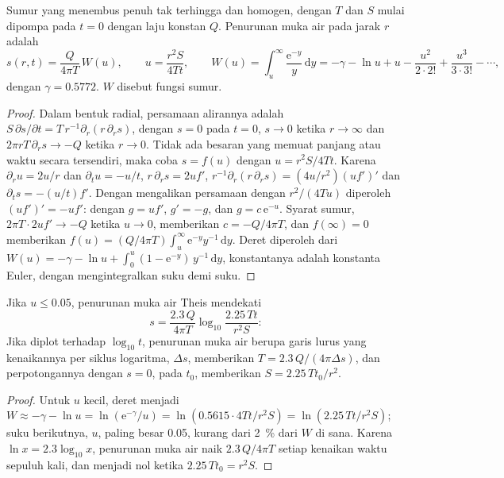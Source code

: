 \begin{theorem}\label{thm:b3:hydrogeology:theis}
Sumur yang menembus penuh  tak terhingga dan homogen,
dengan  $T$ dan  $S$ mulai dipompa pada $t = 0$ dengan
laju konstan $Q$. Penurunan muka air pada jarak $r$ adalah
\[
s(r, t) = \frac{Q}{4\pi T}\,W(u), \qquad u = \frac{r^2S}{4Tt}, \qquad
W(u) = \int_u^\infty\frac{\mathrm e^{-y}}{y}\,\mathrm dy = -\gamma - \ln u +
u - \frac{u^2}{2\cdot2!} + \frac{u^3}{3\cdot3!} - \cdots,
\]
dengan $\gamma = \num{0.5772}$. $W$ disebut fungsi sumur.
\end{theorem}

\begin{proof}
Dalam bentuk radial, persamaan alirannya adalah $S\,\partial s/\partial t =
T\,r^{-1}\partial_r(r\,\partial_rs)$, dengan $s = 0$ pada $t = 0$, $s \to 0$ ketika
$r \to \infty$ dan $2\pi rT\,\partial_rs \to -Q$ ketika $r \to 0$. Tidak ada
besaran yang memuat panjang atau waktu secara tersendiri, maka coba $s = f(u)$ dengan $u =
r^2S/4Tt$. Karena $\partial_ru = 2u/r$ dan $\partial_tu = -u/t$, $r\,\partial_rs =
2uf'$, $r^{-1}\partial_r(r\,\partial_rs) = (4u/r^2)(uf')'$ dan $\partial_ts =
-(u/t)f'$. Dengan mengalikan persamaan dengan $r^2/(4Tu)$ diperoleh $(uf')' = -uf'$:
dengan $g = uf'$, $g' = -g$, dan $g = c\,\mathrm e^{-u}$. Syarat sumur, $2\pi T\cdot2uf' \to -Q$ ketika $u \to 0$, memberikan $c =
-Q/4\pi T$, dan $f(\infty) = 0$ memberikan $f(u) = (Q/4\pi T)\int_u^\infty
\mathrm e^{-y}y^{-1}\,\mathrm dy$. Deret diperoleh dari
$W(u) = -\gamma - \ln u + \int_0^u(1 - \mathrm e^{-y})\,y^{-1}\,\mathrm dy$,
konstantanya adalah konstanta Euler, dengan mengintegralkan suku demi suku.
\end{proof}

\begin{proposition}\label{prop:b3:hydrogeology:cooper-jacob}
Jika $u \le 0.05$, penurunan muka air Theis mendekati
\[
s = \frac{2.3\,Q}{4\pi T}\log_{10}\frac{2.25\,Tt}{r^2S} :
\]
Jika diplot terhadap $\log_{10}t$, penurunan muka air berupa garis lurus yang kenaikannya per
siklus logaritma, $\Delta s$, memberikan $T = 2.3\,Q/(4\pi\Delta s)$, dan
perpotongannya dengan $s = 0$, pada $t_0$, memberikan $S = 2.25\,Tt_0/r^2$.
\end{proposition}

\begin{proof}
Untuk $u$ kecil, deret menjadi $W \approx -\gamma - \ln u = \ln(\mathrm
e^{-\gamma}/u) = \ln(0.5615\cdot4Tt/r^2S) = \ln(2.25\,Tt/r^2S)$; suku
berikutnya, $u$, paling besar \num{0.05}, kurang dari \qty{2}{\percent} dari $W$ di sana.
Karena $\ln x = 2.3\log_{10}x$, penurunan muka air naik $2.3\,Q/4\pi T$ setiap
kenaikan waktu sepuluh kali, dan menjadi nol ketika $2.25\,Tt_0 = r^2S$.
\end{proof}

